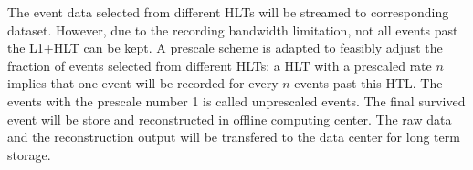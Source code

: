 The event data selected from different HLTs will be streamed to corresponding dataset. However, due to the recording bandwidth limitation, not all events past the L1+HLT can be kept. A prescale scheme is adapted to feasibly adjust the fraction of events selected from different HLTs: a HLT with a prescaled rate $n$ implies that one event will be recorded for every $n$ events past this HTL. The events with the prescale number 1 is called unprescaled events. The final survived event will be store and reconstructed in offline computing center. The raw data and the reconstruction output will be transfered to the data center for long term storage.  